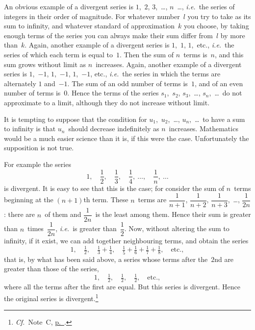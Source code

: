 \documentclass[12pt,leqno]{book}[2005/09/16]
\newcommand{\Chg}[2]{#2}
\newcommand{\Add}[1]{\Chg{}{#1}}
\newcommand{\Pagelabel}[2][page]{\phantomsection\label{#1:#2}}
\newcommand{\Pageref}[2][p.]{\hyperref[page:#2]{#1~\pageref*{page:#2}}}
\newcommand{\PageSep}[1]{\ignorespaces}
\newcommand{\Cf}{\emph{Cf.}}
\newcommand{\ie}{\emph{i.e.}}
\begin{document}
An obvious example of a divergent series
is $1$,~$2$, $3$,~\dots, $n$~\dots\Add{,} \ie~the series of integers
in their order of magnitude. For
whatever number~$l$ you try to take as its
sum to infinity, and whatever standard of
approximation~$k$ you choose, by taking
enough terms of the series you can always
make their sum differ from~$l$ by more than~$k$.
Again, another example of a divergent
series is $1$,~$1$, $1$,~etc., \ie~the series of
which each term is equal to~$1$. Then the
sum of $n$~terms is~$n$, and this sum grows
without limit as $n$~increases. Again, another
example of a divergent series is $1$,~$-1$, $1$,~$-1$,
$1$,~$-1$, etc., \ie~the series in which the terms
are alternately $1$ and~$-1$. The sum of an
odd number of terms is~$1$, and of an even
number of terms is~$0$. Hence the terms of
the series $s_{1}$,~$s_{2}$, $s_{3}$,~\dots\Add{,} $s_{n}$,~\dots\ do not approximate
to a limit, although they do not
increase without limit.

It is tempting to suppose that the condition
for $u_{1}$,~$u_{2}$,~\dots\Add{,} $u_{n}$,~\dots\ to have a sum
to infinity is that $u_{n}$~should decrease indefinitely
as $n$~increases. Mathematics would
be a much easier science than it is, if this
were the case. Unfortunately the supposition
is not true.
\PageSep{204}

For example the series
\[
1,\quad
\frac{1}{2},\quad
\frac{1}{3},\quad
\frac{1}{4},\ \dots,\quad
\frac{1}{n},\ \dots
\]
is divergent. It is easy to see that this is
the case; for consider the sum of $n$~terms
beginning at the $(n + 1)$th term. These $n$~terms
are $\dfrac{1}{n + 1}$, $\dfrac{1}{n + 2}$, $\dfrac{1}{n + 3}$,~\dots\Add{,} $\dfrac{1}{2n}$: there
are $n$~of them and $\dfrac{1}{2n}$~is the least among them.
Hence their sum is greater than $n$~times~$\dfrac{1}{2n}$,
\ie~is greater than~$\dfrac{1}{2}$. Now, without
altering the sum to infinity, if it exist, we
can add together neighbouring terms, and
obtain the series
\[
1,\quad
\tfrac{1}{2},\quad
\tfrac{1}{3} + \tfrac{1}{4},\quad
\tfrac{1}{5} + \tfrac{1}{6} + \tfrac{1}{7} + \tfrac{1}{8},\quad
\text{etc.},
\]
that is, by what has been said above, a series
whose terms after the~$2$nd are greater than
those of the series,
\[
1,\quad
\tfrac{1}{2},\quad
\tfrac{1}{2},\quad
\tfrac{1}{2},\quad
\text{etc.},
\]
where all the terms after the first are equal.
But this series is divergent. Hence the
original series is divergent.\footnote
  {\Chg{Cf.}{\Cf}\ Note~C, \Pageref{noteC}.\Pagelabel{204}}
\end{document}
